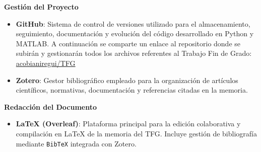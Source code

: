 \documentclass[12pt, a4paper]{article}
\begin{document}
\noindent\textbf{Gestión del Proyecto} 
\begin{itemize}
    \item \textbf{GitHub}: Sistema de control de versiones utilizado para el almacenamiento, seguimiento, documentación y evolución del código desarrollado en Python y MATLAB. A continuación se comparte un enlace al repositorio donde se subirán y gestionarán todos los archivos referentes al Trabajo Fin de Grado: \href{https://github.com/acobianiregui/TFG}{acobianiregui/TFG}
    \item \textbf{Zotero}: Gestor bibliográfico empleado para la organización de artículos científicos, normativas, documentación y referencias citadas en la memoria.
\end{itemize}
\noindent\textbf{Redacción del Documento} 
\begin{itemize}
    \item \textbf{LaTeX (Overleaf)}: Plataforma principal para la edición colaborativa y compilación en LaTeX de la memoria del TFG. Incluye gestión de bibliografía mediante \texttt{BibTeX} integrada con Zotero.
\end{itemize}


\pagestyle{fancy}

\begingroup
\sloppy
\raggedright
\printbibliography
\endgroup
\end{document}
